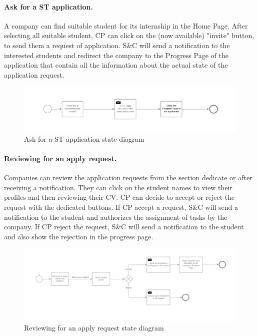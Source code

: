 \paragraph{Ask for a ST application.}
A company can find suitable student for its internship in the Home Page. After selecting all suitable student, CP can click on the (now available) "invite" button, to send them a request of application.
S\&C will send a notification to the interested students and redirect the company to the Progress Page of the application that contain all the information about the actual state of the application request.

\begin{figure}[H]
    \begin{center}
        \includegraphics[width=1\linewidth]{RASD/LaTeX/Images/StateDiagrams/ask_for_a_ST_application.png}
        \caption{Ask for a ST application state diagram}
        \label{fig:ask_for_a_ST_application_sd}%
    \end{center}
\end{figure}

\paragraph{Reviewing for an apply request.}
Companies can review the application requests from the section dedicate or after receiving a notification. They can click on the student names to view their profiles and then reviewing their CV.
CP can decide to accept or reject the request with the dedicated buttons. 
If CP accept a request, S\&C will send a notification to the student and authorizes the assignment of tasks by the company.
If CP reject the request, S\&C will send a notification to the student and also show the rejection in the progress page.

\begin{figure}[H]
    \begin{center}
        \includegraphics[width=1\linewidth]{RASD/LaTeX/Images/StateDiagrams/reviewing_an_apply_request.png}
        \caption{Reviewing for an apply request state diagram}
        \label{fig:reviewing_an_apply_request_sd}%
    \end{center}
\end{figure}


